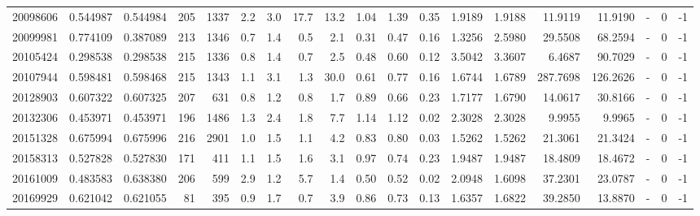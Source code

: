 \begin{tabular}{rrrrrrrrrrrrrrrrlrr}
  20098606 & 0.544987 &   0.544984 &  205 & 1337 &      2.2 &      3.0 &    17.7 &     13.2 &       1.04 &        1.39 &        0.35 &  1.9189 &  1.9188 &   11.9119 &   11.9190 &             - &        0 &         -1 \\
  20099981 & 0.774109 &   0.387089 &  213 & 1346 &      0.7 &      1.4 &     0.5 &      2.1 &       0.31 &        0.47 &        0.16 &  1.3256 &  2.5980 &   29.5508 &   68.2594 &             - &        0 &         -1 \\
  20105424 & 0.298538 &   0.298538 &  215 & 1336 &      0.8 &      1.4 &     0.7 &      2.5 &       0.48 &        0.60 &        0.12 &  3.5042 &  3.3607 &    6.4687 &   90.7029 &             - &        0 &         -1 \\
  20107944 & 0.598481 &   0.598468 &  215 & 1343 &      1.1 &      3.1 &     1.3 &     30.0 &       0.61 &        0.77 &        0.16 &  1.6744 &  1.6789 &  287.7698 &  126.2626 &             - &        0 &         -1 \\
  20128903 & 0.607322 &   0.607325 &  207 &  631 &      0.8 &      1.2 &     0.8 &      1.7 &       0.89 &        0.66 &        0.23 &  1.7177 &  1.6790 &   14.0617 &   30.8166 &             - &        0 &         -1 \\
  20132306 & 0.453971 &   0.453971 &  196 & 1486 &      1.3 &      2.4 &     1.8 &      7.7 &       1.14 &        1.12 &        0.02 &  2.3028 &  2.3028 &    9.9955 &    9.9965 &             - &        0 &         -1 \\
  20151328 & 0.675994 &   0.675996 &  216 & 2901 &      1.0 &      1.5 &     1.1 &      4.2 &       0.83 &        0.80 &        0.03 &  1.5262 &  1.5262 &   21.3061 &   21.3424 &             - &        0 &         -1 \\
  20158313 & 0.527828 &   0.527830 &  171 &  411 &      1.1 &      1.5 &     1.6 &      3.1 &       0.97 &        0.74 &        0.23 &  1.9487 &  1.9487 &   18.4809 &   18.4672 &             - &        0 &         -1 \\
  20161009 & 0.483583 &   0.638380 &  206 &  599 &      2.9 &      1.2 &     5.7 &      1.4 &       0.50 &        0.52 &        0.02 &  2.0948 &  1.6098 &   37.2301 &   23.0787 &             - &        0 &         -1 \\
  20169929 & 0.621042 &   0.621055 &   81 &  395 &      0.9 &      1.7 &     0.7 &      3.9 &       0.86 &        0.73 &        0.13 &  1.6357 &  1.6822 &   39.2850 &   13.8870 &             - &        0 &         -1 \\

\end{tabular}
